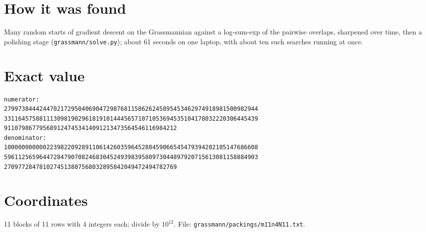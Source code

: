 \documentclass[11pt,a4paper]{article}
\begin{document}
\section{How it was found}
Many random starts of gradient descent on the Grassmannian against a log-sum-exp of the pairwise overlaps, sharpened over time, then a polishing stage (\texttt{grassmann/solve.py}); about 61 seconds on one laptop, with about ten such searches running at once.


\appendix
\section{Exact value}
{\small
\begin{verbatim}
numerator:
279973844424470217295040690472987681158626245895453462974918981500982944
331164575881113098190296181910144456571071053694535104178032220306445439
9110798677956891247453414091213473564546116984212
denominator:
100000000000223982209289110614260359645288459066545479394202105147686608
596112565964472847907082468304524939839580973044897920715613081158884903
2709772847810274513807568032895842049472494782769
\end{verbatim}}

\section{Coordinates}
11 blocks of 11 rows with 4 integers each; divide by $10^{12}$. File: \texttt{grassmann/packings/m11n4N11.txt}.
{\tiny
\begin{multicols}{3}
\end{multicols}}
\end{document}

